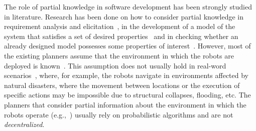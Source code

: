 The role of partial knowledge in software development has been strongly studied in literature.
Research has been done on how to consider partial knowledge in requirement analysis and elicitation~\cite{menghi2017integrating,menghi2017cover,letier2008deriving}, in the development of a model of the system that satisfies a set of desired properties~\cite{uchitel2009synthesis,uchitel2013supporting,famelis2012partial,albarghouthi2012under,Bernasconi2017} and in checking   whether an  already designed model possesses some properties of interest~\cite{menghi2016dealing,bruns1999model,chechik2004multi}.
However, most of the existing planners assume that the environment in which the robots are deployed is known~\cite{7139412}. 
This assumption does not usually hold in real-word scenarios~\cite{lahijanian2016iterative},  where, for example,  the robots navigate in environments affected by natural disasters, where the movement between locations or the execution of specific actions may be impossible due to structural collapses, flooding, etc.
The planners that consider  partial information about the environment in which the robots operate (e.g.,~\cite{roy2006planning,du2012robot,diaz2001exploring}) usually rely on probabilistic algorithms and are not  \emph{decentralized}.




